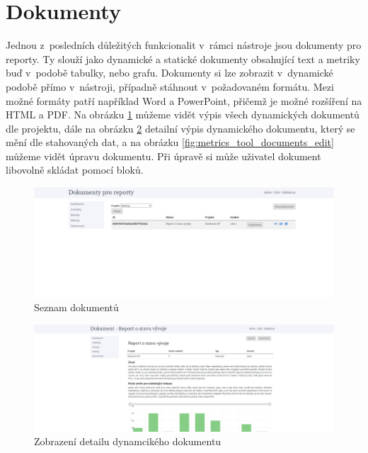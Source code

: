\documentclass[czech,master]{diploma}
\begin{document}
\section{Dokumenty}
Jednou z~posledních důležitých funkcionalit v~rámci nástroje jsou dokumenty pro reporty. Ty slouží jako dynamické a statické dokumenty obsahující text a metriky buď v~podobě tabulky, nebo grafu. Dokumenty si lze zobrazit v~dynamické podobě přímo v~nástroji, případně stáhnout v~požadovaném formátu. Mezi možné formáty patří například Word a PowerPoint, přičemž je možné rozšíření na HTML a PDF. Na obrázku \ref{fig:metrics_tool_documents} můžeme vidět výpis všech dynamických dokumentů dle projektu, dále na obrázku \ref{fig:metrics_tool_documents_detail} detailní výpis dynamického dokumentu, který se mění dle stahovaných dat, a na obrázku \ref{fig:metrics_tool_documents_edit} můžeme vidět úpravu dokumentu. Při úpravě si může uživatel dokument libovolně skládat pomocí bloků. 

\begin{figure}[!ht]
    \centering
    \includegraphics[width=1\textwidth]{Diplomka/Figures/metrics_tool/documents.jpg}
    \caption{Seznam dokumentů}
    \label{fig:metrics_tool_documents}
\end{figure}

\begin{figure}[!ht]
    \centering
    \includegraphics[width=1\textwidth]{Diplomka/Figures/metrics_tool/documents_detail.jpg}
    \caption{Zobrazení detailu dynamcikého dokumentu}
    \label{fig:metrics_tool_documents_detail}
\end{figure}
\end{document}
